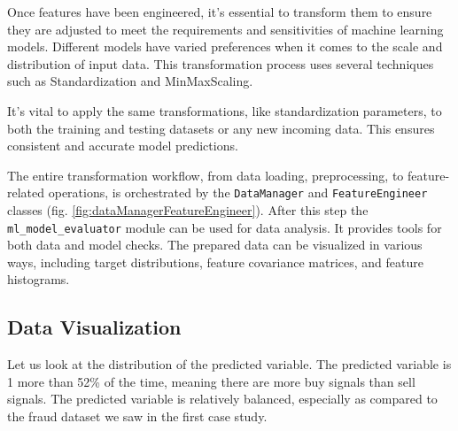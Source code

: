 Once features have been engineered, it's essential to transform them to ensure they are adjusted to meet the requirements and sensitivities of machine learning models. Different models have varied preferences when it comes to the scale and distribution of input data. This transformation process uses several techniques such as Standardization and MinMaxScaling.

It's vital to apply the same transformations, like standardization parameters, to both the training and testing datasets or any new incoming data. This ensures consistent and accurate model predictions.

The entire transformation workflow, from data loading, preprocessing, to feature-related operations, is orchestrated by the \texttt{DataManager} and \texttt{FeatureEngineer} classes (fig. \ref{fig:dataManagerFeatureEngineer}).
After this step the \texttt{ml\_model\_evaluator} module can be used for data analysis. It provides tools for both data and model checks. The prepared data can be visualized in various ways, including target distributions, feature covariance matrices, and feature histograms.

\subsection{Data Visualization}
Let us look at the distribution of the predicted variable. The predicted variable is 1 more than 52\% of the time, meaning there are more buy
signals than sell signals. The predicted variable is relatively balanced, especially as
compared to the fraud dataset we saw in the first case study.



